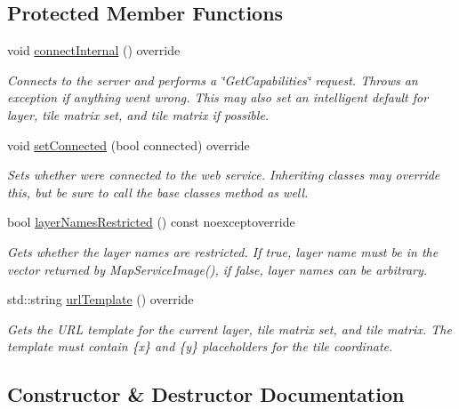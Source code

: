 \subsection*{Protected Member Functions}
\begin{DoxyCompactItemize}
\item 
void \hyperlink{classdg_1_1deepcore_1_1imagery_1_1_wmts_client_a455a22a51644b4f89a70c163141cc3a1}{connect\+Internal} () override
\begin{DoxyCompactList}\small\item\em Connects to the server and performs a \char`\"{}\+Get\+Capabilities\char`\"{} request. Throws an exception if anything went wrong. This may also set an intelligent default for layer, tile matrix set, and tile matrix if possible. \end{DoxyCompactList}\item 
void \hyperlink{classdg_1_1deepcore_1_1imagery_1_1_wmts_client_aad9106986ebd3f1af5ee9b4f2a756ba4}{set\+Connected} (bool connected) override
\begin{DoxyCompactList}\small\item\em Sets whether we\textquotesingle{}re connected to the web service. Inheriting classes may override this, but be sure to call the base classe\textquotesingle{}s method as well. \end{DoxyCompactList}\item 
bool \hyperlink{classdg_1_1deepcore_1_1imagery_1_1_wmts_client_af896545533026802ea688f59f170aa0f}{layer\+Names\+Restricted} () const noexceptoverride
\begin{DoxyCompactList}\small\item\em Gets whether the layer names are restricted. If true, layer name must be in the vector returned by Map\+Service\+Image(), if false, layer names can be arbitrary. \end{DoxyCompactList}\item 
std\+::string \hyperlink{classdg_1_1deepcore_1_1imagery_1_1_wmts_client_ae9ec4a090ea93422dd3beec62c50f5bc}{url\+Template} () override
\begin{DoxyCompactList}\small\item\em Gets the U\+RL template for the current layer, tile matrix set, and tile matrix. The template must contain \{x\} and \{y\} placeholders for the tile coordinate. \end{DoxyCompactList}\end{DoxyCompactItemize}


\subsection{Constructor \& Destructor Documentation}
